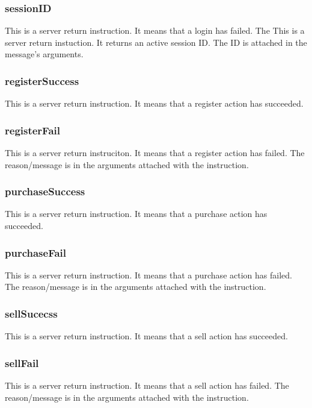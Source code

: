 \documentclass[a4paper]{article}
\begin{document}
\subsubsection{sessionID}
\label{protocol_inst_sessionID}
This is a server return instruction. It means that a login has failed. The
This is a server return instuction. It returns an active session ID. The ID is
attached in the message's arguments.

\subsubsection{registerSuccess}
\label{protocol_inst_registersuccess}
This is a server return instruction. It means that a register action has
succeeded.

\subsubsection{registerFail}
\label{protocol_inst_registerfail}
This is a server return instruciton. It means that a register action has
failed. The reason/message is in the arguments attached with the instruction.

\subsubsection{purchaseSuccess}
\label{protocol_inst_purchasesuccess}
This is a server return instruction. It means that a purchase action has
succeeded.

\subsubsection{purchaseFail}
\label{protocol_inst_purchasefail}
This is a server return instruction. It means that a purchase action has
failed. The reason/message is in the arguments attached with the instruction.

\subsubsection{sellSucecss}
\label{protocol_inst_sellsuccess}
This is a server return instruction. It means that a sell action has succeeded.

\subsubsection{sellFail}
\label{protocol_inst_sellfail}
This is a server return instruction. It means that a sell action has failed.
The reason/message is in the arguments attached with the instruction.
\end{document}
